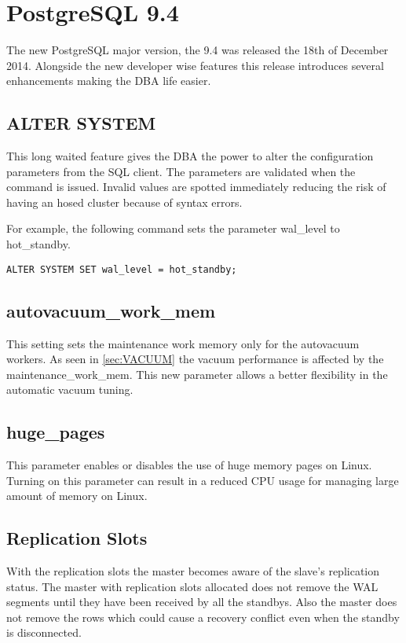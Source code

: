 \chapter{PostgreSQL 9.4}

The new PostgreSQL major version, the 9.4 was released the 18th of December 2014. Alongside the
new developer wise features this release introduces several enhancements making the DBA life easier.

\section{ALTER SYSTEM}
This long waited feature gives the DBA the power to alter the configuration parameters
from the SQL client. The parameters are validated when the command is issued. Invalid values
are spotted immediately reducing the risk of having an hosed cluster because of syntax errors.

For example, the following command sets the parameter wal\_level to hot\_standby. 
\begin{lstlisting}[style=pgsql]
 ALTER SYSTEM SET wal_level = hot_standby;

\end{lstlisting}

\section{autovacuum\_work\_mem}
This setting sets the maintenance work memory only for the autovacuum workers. As seen in
\ref{sec:VACUUM} the vacuum performance is affected by the maintenance\_work\_mem. This new
parameter allows a better flexibility in the automatic vacuum tuning.


\section{huge\_pages}
This parameter enables or disables the use of huge memory pages on Linux. Turning on this parameter can
result in a reduced CPU usage for managing large amount of memory on Linux.

\section{Replication Slots}
With the replication slots the master becomes aware of the slave's replication status. The master
with replication slots allocated does not remove the WAL segments until they have been received by all
the standbys. Also the master does not remove the rows which could cause a recovery conflict even when
the standby is disconnected. 


